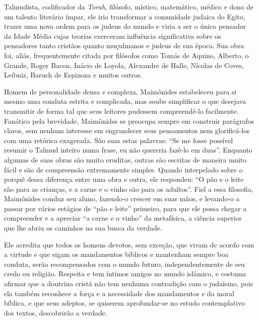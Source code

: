 Talmudista, codificador da \emph{Torah}, filósofo, místico, matemático,
médico e dono de um talento literário ímpar, ele iria transformar a
comunidade judaica do Egito, trazer uma nova ordem para os judeus do
mundo e viria a ser o único pensador da Idade Média cujas teorias
exerceram influência significativa sobre os pensadores tanto cristãos
quanto muçulmanos e judeus de sua época. Sua obra foi, aliás,
frequentemente citada por filósofos como Tomás de Aquino, Alberto, o
Grande, Roger Bacon, Inácio de Loyola, Alexandre de Halle, Nícolas de
Coves, Leibniz, Baruch de Espinoza e muitos outros.

Homem de personalidade densa e complexa, Maimônides estabeleceu para si
mesmo uma conduta estrita e complicada, mas soube simplificar o que
desejava transmitir de forma tal que seus leitores pudessem
compreendê-lo facilmente. Fanático pela brevidade, Maimônides se
preocupa sempre em construir parágrafos claros, sem nenhum interesse em engrandecer seus
pensamentos nem glorificá-los com uma retórica exagerada. São suas
estas palavras: ``Se me fosse possível resumir o Talmud inteiro numa
frase, eu não quereria fazê-lo em duas''. Enquanto algumas de suas obras
são muito eruditas, outras são escritas de maneira muito fácil e são de
compreensão extremamente simples. Quando interpelado sobre o porquê
dessa diferença entre uma obra e outra, ele respondeu: ``O pão e o
leite são para as crianças, e a carne e o vinho são para os adultos''.
Fiel a essa filosofia, Maimônides conduz seu aluno, fazendo-o crescer em
suas mãos, e levando-o a passar por vários estágios de ``pão e leite''
primeiro, para que ele possa chegar a compreender e a apreciar ``a carne
e o vinho'' da metafísica, a ciência superior que lhe abriu os caminhos
na sua busca da verdade.

Ele acredita que todos os homens devotos, sem exceção, que vivam de
acordo com a virtude e que sigam os mandamentos bíblicos e mantenham
sempre boa conduta, serão recompensados com o mundo futuro,
independentemente de seu credo ou religião. Respeita e tem íntimos
amigos no mundo islâmico, e costuma afirmar que a doutrina cristã não
tem nenhuma contradição com o judaísmo, pois ela também reconhece a
força e a necessidade dos mandamentos e da moral bíblica, e que seus
adeptos, se quiserem aprofundar-se no estudo contemplativo dos textos,
descobrirão a verdade.

